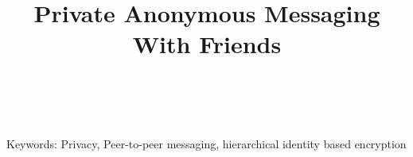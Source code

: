 \documentclass[conference]{IEEEtran}
\begin{document}
%
\title{Private Anonymous Messaging With Friends}


\author{
}





\maketitle


\begin{abstract}
\\
\end{abstract}

Keywords: Privacy, Peer-to-peer messaging, hierarchical identity based encryption


\IEEEpeerreviewmaketitle






















 

\end{document}
